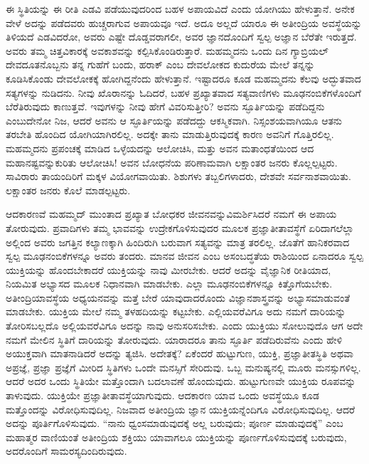 ಈ ಸ್ಥಿತಿಯನ್ನು ಈ ರೀತಿ ಎಡವಿ ಪಡೆಯುವುದರಿಂದ ಬಹಳ ಅಪಾಯವಿದೆ ಎಂದು ಯೋಗಿಯು ಹೇಳುತ್ತಾನೆ. ಅನೇಕ ವೇಳೆ ಅದನ್ನು ಪಡೆದವರು ಹುಚ್ಚರಾಗುವ ಅಪಾಯವೂ ಇದೆ. ಅದೂ ಅಲ್ಲದೆ ಯಾರೂ ಈ ಅತೀಂದ್ರಿಯ ಅವಸ್ಥೆಯನ್ನು ತಿಳಿಯದೆ ಎಡವಿದರೋ, ಅವರು ಎಷ್ಟೇ ದೊಡ್ಡವರಾಗಲೀ, ಅವರ ಜ್ಞಾನದೊಂದಿಗೆ ಸ್ವಲ್ಪ ಅಜ್ಞಾನ ಬೆರೆತೇ ಇರುತ್ತದೆ. ಅವರು ತಮ್ಮ ಚಿತ್ತವಿಕಾರಕ್ಕೆ ಅವಕಾಶವನ್ನು ಕಲ್ಪಿಸಿಕೊಂಡಿರುತ್ತಾರೆ. ಮಹಮ್ಮದನು ಒಂದು ದಿನ ಗ್ಯಾಬ್ರಿಯಲ್​ ದೇವದೂತನೊಬ್ಬನು ತನ್ನ ಗುಹೆಗೆ ಬಂದು, ಹರಾಕ್​ ಎಂಬ ದೇವಲೋಕದ ಕುದುರೆಯ ಮೇಲೆ ತನ್ನನ್ನು ಕೂಡಿಸಿಕೊಂಡು ದೇವಲೋಕಕ್ಕೆ ಹೋಗಿದ್ದನೆಂದು ಹೇಳುತ್ತಾನೆ. ಇಷ್ಟಾದರೂ ಕೂಡ ಮಹಮ್ಮದನು ಕೆಲವು ಅದ್ಭುತವಾದ ಸತ್ಯಗಳನ್ನು ನುಡಿದನು. ನೀವು ಖೊರಾನನ್ನು ಓದಿದರೆ, ಬಹಳ ಪ್ರಖ್ಯಾತವಾದ ಸತ್ಯವಾಣಿಗಳು ಮೂಢನಂಬಿಕೆಗಳೊಂದಿಗೆ ಬೆರೆತಿರುವುದು ಕಾಣುತ್ತವೆ. ಇವುಗಳನ್ನು ನೀವು ಹೇಗೆ ವಿವರಿಸುತ್ತೀರಿ? ಅವನು ಸ್ಫೂರ್ತಿಯನ್ನು ಪಡೆದಿದ್ದನು ಎಂಬುದೇನೋ ನಿಜ, ಆದರೆ ಅವನು ಆ ಸ್ಫೂರ್ತಿಯನ್ನು ಪಡೆದದ್ದು ಆಕಸ್ಮಿಕವಾಗಿ. ನಿಸ್ಸಂಶಯವಾಗಿಯೂ ಆತನು ತರಬೇತಿ ಹೊಂದಿದ ಯೋಗಿಯಾಗಿರಲಿಲ್ಲ. ಅದಕ್ಕೇ ತಾನು ಮಾಡುತ್ತಿರುವುದಕ್ಕೆ ಕಾರಣ ಅವನಿಗೆ ಗೊತ್ತಿರಲಿಲ್ಲ. ಮಹಮ್ಮದನು ಪ್ರಪಂಚಕ್ಕೆ ಮಾಡಿದ ಒಳ್ಳೆಯದನ್ನು ಆಲೋಚಿಸಿ, ಮತ್ತು ಅವನ ಮತಾಂಧತೆಯಿಂದ ಆದ ಮಹಾನಷ್ಟವನ್ನುಕುರಿತು ಆಲೋಚಿಸಿ! ಅವನ ಬೋಧನೆಯ ಪರಿಣಾಮವಾಗಿ ಲಕ್ಷಾಂತರ ಜನರು ಕೊಲ್ಲಲ್ಪಟ್ಟರು. ಸಾವಿರಾರು ತಾಯಂದಿರಿಗೆ ಮಕ್ಕಳ ವಿಯೋಗವಾಯಿತು. ಶಿಶುಗಳು ತಬ್ಬಲಿಗಳಾದರು, ದೇಶವೇ ಸರ್ವನಾಶವಾಯಿತು. ಲಕ್ಷಾಂತರ ಜನರು ಕೊಲೆ ಮಾಡಲ್ಪಟ್ಟರು. 

ಆದಕಾರಣವೆ ಮಹಮ್ಮದ್​ ಮುಂತಾದ ಪ್ರಖ್ಯಾತ ಬೋಧಕರ ಜೀವನವನ್ನು\break ವಿಮರ್ಶಿಸಿದರೆ ನಮಗೆ ಈ ಅಪಾಯ ತೋರುವುದು. ಪ್ರವಾದಿಗಳು ತಮ್ಮ ಭಾವವನ್ನು ಉದ್ರೇಕಗೊಳಿಸುವುದರ ಮೂಲಕ ಪ್ರಜ್ಞಾತೀತಾವಸ್ಥೆಗೆ ಏರಿದಾಗಲೆಲ್ಲಾ ಅಲ್ಲಿಂದ ಅವರು ಜಗತ್ತಿನ ಕಲ್ಯಾಣಕ್ಕಾಗಿ ಹಿಂದಿರುಗಿ ಬರುವಾಗ ಸತ್ಯವನ್ನು ಮಾತ್ರ ತರಲಿಲ್ಲ. ಜೊತೆಗೆ ಹಾನಿಕರವಾದ ಸ್ವಲ್ಪ ಮೂಢನಂಬಿಕೆಗಳನ್ನೂ ಅವರು ತಂದರು. ಮಾನವ ಜೀವನ ಎಂಬ ಅಸಂಬದ್ಧತೆಯ ರಾಶಿಯಿಂದ ಏನಾದರೂ ಸ್ವಲ್ಪ ಯುಕ್ತಿಯನ್ನು ಹೊಂದಬೇಕಾದರೆ ಯುಕ್ತಿಯನ್ನು ನಾವು ಮೀರಬೇಕು. ಆದರೆ ಅದನ್ನು ವೈಜ್ಞಾನಿಕ ರೀತಿಯಾದ, ನಿಯಮಿತ ಅಭ್ಯಾಸದ ಮೂಲಕ ನಿಧಾನವಾಗಿ ಮಾಡಬೇಕು. ಎಲ್ಲಾ ಮೂಢನಂಬಿಕೆಗಳನ್ನೂ ಕಿತ್ತೊಗೆಯಬೇಕು. ಅತೀಂದ್ರಿಯಾವಸ್ಥೆಯ ಅಧ್ಯಯನವನ್ನು ಮತ್ತೆ ಬೇರೆ ಯಾವುದಾದರೊಂದು ವಿಜ್ಞಾನಶಾಸ್ತ್ರವನ್ನು ಅಭ್ಯಾಸಮಾಡುವಂತೆ ಮಾಡಬೇಕು. ಯುಕ್ತಿಯ ಮೇಲೆ ನಮ್ಮ ತಳಹದಿಯನ್ನು ಕಟ್ಟಬೇಕು. ಎಲ್ಲಿಯವರೆವಿಗೂ ಅದು ನಮಗೆ ದಾರಿಯನ್ನು ತೋರಿಸಬಲ್ಲದೊ ಅಲ್ಲಿಯವರೆವಿಗೂ ಅದನ್ನು ನಾವು ಅನುಸರಿಸಬೇಕು. ಎಂದು ಯುಕ್ತಿಯು ಸೋಲುವುದೊ ಆಗ ಅದೇ ನಮಗೆ ಮೇಲಿನ ಸ್ಥಿತಿಗೆ ದಾರಿಯನ್ನು ತೋರುವುದು. ಯಾರಾದರೂ ತಾನು ಸ್ಫೂರ್ತಿ ಪಡೆದಿರುವೆನು ಎಂದು ಹೇಳಿ ಅಯುಕ್ತವಾಗಿ ಮಾತನಾಡಿದರೆ ಅದನ್ನು ತ್ಯಜಿಸಿ. ಅದೇತಕ್ಕೆ? ಏಕೆಂದರೆ ಹುಟ್ಟುಗುಣ, ಯುಕ್ತಿ, ಪ್ರಜ್ಞಾತೀತಸ್ಥಿತಿ ಅಥವಾ ಅಪ್ರಜ್ಞೆ, ಪ್ರಜ್ಞಾ ಪ್ರಜ್ಞೆಗೆ ಮೀರಿದ ಸ್ಥಿತಿಗಳು ಒಂದೇ ಮನಸ್ಸಿಗೆ ಸೇರಿದುವು. ಒಬ್ಬ ಮನುಷ್ಯನಲ್ಲಿ ಮೂರು ಮನಸ್ಸುಗಳಿಲ್ಲ. ಆದರೆ ಅದರ ಒಂದು ಸ್ಥಿತಿಯೇ ಮತ್ತೊಂದಾಗಿ ಬದಲಾವಣೆ ಹೊಂದುವುದು. ಹುಟ್ಟುಗುಣವೇ ಯುಕ್ತಿಯ ರೂಪವನ್ನು ತಾಳುವುದು. ಯುಕ್ತಿಯೇ ಪ್ರಜ್ಞಾತೀತಾವಸ್ಥೆಯಾಗುವುದು. ಆದಕಾರಣ ಯಾವ ಒಂದು ಅವಸ್ಥೆಯೂ ಕೂಡ ಮತ್ತೊಂದನ್ನು ವಿರೋಧಿಸುವುದಿಲ್ಲ. ನಿಜವಾದ ಅತೀಂದ್ರಿಯ ಜ್ಞಾನ ಯುಕ್ತಿಯನ್ನೆಂದಿಗೂ ವಿರೋಧಿಸುವುದಿಲ್ಲ. ಆದರೆ ಅದನ್ನು ಪೂರ್ತಿಗೊಳಿಸುವುದು. “ನಾನು ಧ್ವಂಸಮಾಡುವುದಕ್ಕೆ ಅಲ್ಲ ಬರುವುದು; ಪೂರ್ಣ ಮಾಡುವುದಕ್ಕೆ” ಎಂಬ ಮಹಾತ್ಮರ ವಾಣಿಯಂತೆ ಅತೀಂದ್ರಿಯ ಶಕ್ತಿಯು ಯಾವಾಗಲೂ ಯುಕ್ತಿಯನ್ನು ಪೂರ್ಣಗೊಳಿಸುವುದಕ್ಕೆ ಬರುವುದು, ಅದರೊಂದಿಗೆ ಸಾಮರಸ್ಯದಿಂದಿರುವುದು. 

